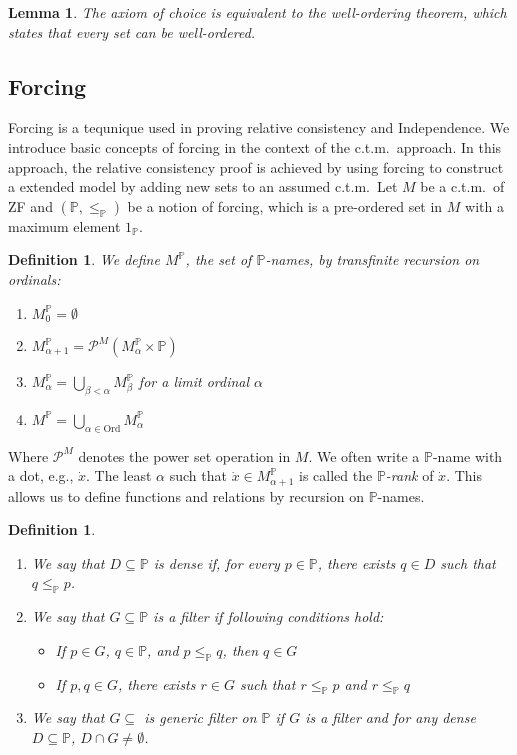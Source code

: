 \documentclass{report}
\newtheorem{lem}[thm]{Lemma}
\newtheorem{dfn}[thm]{Definition}
\begin{document}
\begin{lem}
  The axiom of choice is equivalent to the well-ordering theorem, which states that every set can be well-ordered.
\end{lem}

\subsection{Forcing}
Forcing is a tequnique used in proving relative consistency and Independence.
We introduce basic concepts of forcing in the context of the c.t.m.\  approach.
In this approach, the relative consistency proof is achieved by using forcing to construct a extended model by adding new sets to an assumed c.t.m.\ 
Let $M$ be a c.t.m.\  of ZF and $(\mathbb{P}, \leq_{\mathbb{P}})$ be a notion of forcing, which is a pre-ordered set in $M$ with a maximum element $1_{\mathbb{P}}$.

\begin{dfn}
  We define $M^{\mathbb{P}}$, the set of \emph{$\mathbb{P}$-names}, by transfinite recursion on ordinals:
  \begin{enumerate}
    \item $M^{\mathbb{P}}_0 = \emptyset$
    \item $M^{\mathbb{P}}_{\alpha + 1} = \mathcal{P}^M(M^{\mathbb{P}}_{\alpha} \times \mathbb{P})$
    \item $M^{\mathbb{P}}_{\alpha} = \bigcup_{\beta < \alpha} M^{\mathbb{P}}_{\beta}$ for a limit ordinal $\alpha$
    \item $M^{\mathbb{P}} = \bigcup_{\alpha \in \mathrm{Ord}} M^{\mathbb{P}}_{\alpha}$
  \end{enumerate}
\end{dfn}
Where $\mathcal{P}^M$ denotes the power set operation in $M$. 
We often write a $\mathbb{P}$-name with a dot, e.g., $\dot{x}$.
The least $\alpha$ such that $\dot{x} \in M^{\mathbb{P}}_{\alpha + 1}$ is called the \emph{$\mathbb{P}$-rank} of $\dot{x}$.
This allows us to define functions and relations by recursion on $\mathbb{P}$-names.

\begin{dfn}  
  \,
  \begin{enumerate}
    \item We say that $D \subseteq \mathbb{P}$ is \emph{dense} if, for every $p \in \mathbb{P}$, there exists $q \in D$ such that $q \leq_{\mathbb{P}} p$.
    \item We say that $G \subseteq \mathbb{P}$ is a \emph{filter} if following conditions hold:
      \begin{itemize}
        \item If $p \in G$, $q \in \mathbb{P}$, and $p \leq_{\mathbb{P}} q$, then $q \in G$
        \item If $p, q \in G$, there exists $r \in G$ such that $r \leq_{\mathbb{P}} p$ and $r \leq_{\mathbb{P}} q$
      \end{itemize}
    \item We say that $G \subseteq$ is \emph{generic filter} on $\mathbb{P}$ if $G$ is a filter and for any dense $D \subseteq \mathbb{P}$, $D \cap G \neq \emptyset$.
  \end{enumerate}
\end{dfn}
\end{document}

